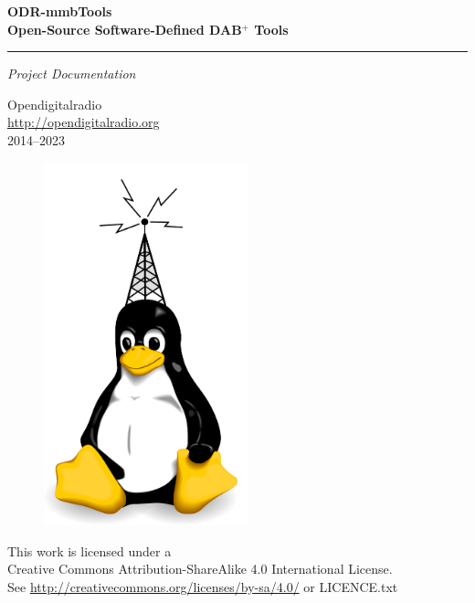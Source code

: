 \documentclass[a4paper,oneside,10pt]{article}
\newcommand{\dabplus}{DAB$^\mathrm{+}$\xspace}
\newcommand{\titleinfo}{ODR-mmbTools \\
Open-Source Software-Defined \dabplus Tools}
\begin{document}
 \begin{titlepage}
    \null\vfil
    \begin{flushleft}
      \huge \textbf{\titleinfo}
    \end{flushleft}
    \par
    \hrule height 4pt
    \par
    \begin{flushright}
      \large
      \textsl{Project Documentation} \par
    \end{flushright}
    \vspace{\fill}

    \begin{center}
        \Large
        Opendigitalradio\\\href{http://opendigitalradio.org}{http://opendigitalradio.org}\\2014--2023
    \end{center}
    \vspace{\fill}

    \begin{figure}[!h]
        \centering
        \parbox{2.2in}{\includegraphics[width=16em]{figures/dabtux.pdf}}
    \end{figure}

    \vspace*{1cm}
    \begin{center}
    This work is licensed under a \\
    Creative Commons Attribution-ShareAlike 4.0 International License.\\
    See \url{http://creativecommons.org/licenses/by-sa/4.0/} or LICENCE.txt
    \end{center}
 \end{titlepage}
\end{document}
